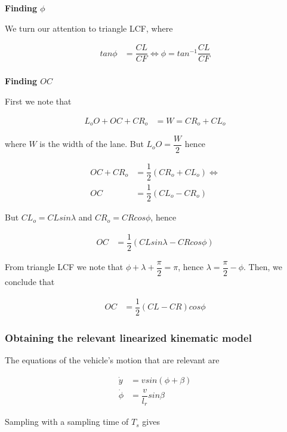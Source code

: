 \documentclass[oneside,12pt]{article}
\begin{document}
    \textbf{Finding $\phi$}

    We turn our attention to triangle LCF, where

    \begin{align}
      tan\phi &= \dfrac{CL}{CF} \Leftrightarrow \phi = tan^{-1} \dfrac{CL}{CF} \\
    \end{align}


    \textbf{Finding $OC$}

    First we note that

    \begin{align}
      L_o O + OC + CR_o &= W = CR_o + CL_o
    \end{align}

    where $W$ is the width of the lane. But $L_o O = \dfrac{W}{2}$ hence

    \begin{align}
      OC + CR_o &= \dfrac{1}{2}(CR_o + CL_o) \Leftrightarrow \\
      OC &= \dfrac{1}{2}(CL_o - CR_o)
    \end{align}

    But $CL_o = CL sin\lambda$ and $CR_o = CR cos\phi$, hence


    \begin{align}
      OC &= \dfrac{1}{2}(CL sin\lambda - CR cos\phi)
    \end{align}

    From triangle LCF we note that $\phi + \lambda + \dfrac{\pi}{2} = \pi$,
    hence $\lambda = \dfrac{\pi}{2} - \phi$. Then, we conclude that

    \begin{align}
      OC &= \dfrac{1}{2}(CL - CR) cos\phi
    \end{align}




    \subsubsection{Obtaining the relevant linearized kinematic model}

    The equations of the vehicle's motion that are relevant are

    \begin{align}
      \dot{y} &= v sin(\phi + \beta) \\
      \dot{\phi} &= \dfrac{v}{l_r} sin\beta
    \end{align}

    Sampling with a sampling time of $T_s$ gives
\end{document}
